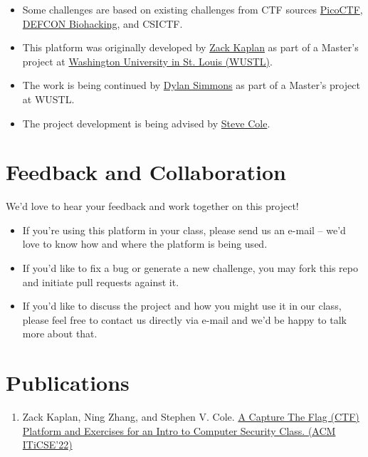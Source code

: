 \documentclass[11pt]{article}
\begin{document}
\begin{itemize}
   \item Some challenges are based on existing challenges from CTF sources \href{https://www.picoctf.org/}{PicoCTF}, \href{https://www.defconbiohackingvillage.org/}{DEFCON Biohacking}, and CSICTF.
   \item This platform was originally developed by \href{mailto:zack.kaplan@wustl.edu}{Zack Kaplan} as part of a Master's project at \href{https://wustl.edu/}{Washington University in St. Louis (WUSTL)}.
   \item The work is being continued by \href{mailto:dylan.simmons@wustl.edu}{Dylan Simmons} as part of a Master's project at WUSTL.
   \item The project development is being advised by \href{mailto:svcole@wustl.edu}{Steve Cole}.
\end{itemize}

\section{Feedback and Collaboration}

We'd love to hear your feedback and work together on this project!

\begin{itemize}
   \item If you're using this platform in your class, please send us an e-mail --  we'd love to know how and where the platform is being used.
   \item If you'd like to fix a bug or generate a new challenge, you may fork this repo and initiate pull requests against it. 
   \item If you'd like to discuss the project and how you might use it in our class, please feel free to contact us directly via e-mail and we'd be happy to talk more about that.
\end{itemize}

\section{Publications}

\begin{enumerate}
   \item Zack Kaplan, Ning Zhang, and Stephen V. Cole. \href{https://doi.org/10.1145/3502717.3532153}{A Capture The Flag (CTF) Platform and Exercises for an Intro to Computer Security Class. (ACM ITiCSE'22)}
\end{enumerate}
\end{document}

